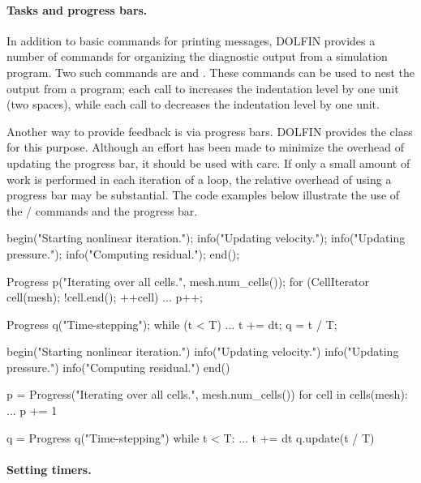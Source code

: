 \paragraph{Tasks and progress bars.}

In addition to basic commands for printing messages, DOLFIN provides a
number of commands for organizing the diagnostic output from a simulation
program. Two such commands are  and . These commands
can be used to nest the output from a program; each call to 
increases the indentation level by one unit (two spaces), while each
call to  decreases the indentation level by one unit.

Another way to provide feedback is via progress bars. DOLFIN provides
the  class for this purpose. Although an effort has been
made to minimize the overhead of updating the progress bar, it should
be used with care. If only a small amount of work is performed in each
iteration of a loop, the relative overhead of using a progress bar
may be substantial. The code examples below illustrate the use of the
/ commands and the progress bar.
\begin{c++}
begin("Starting nonlinear iteration.");
info("Updating velocity.");
info("Updating pressure.");
info("Computing residual.");
end();

Progress p("Iterating over all cells.", mesh.num_cells());
for (CellIterator cell(mesh); !cell.end(); ++cell)
{
  ...
  p++;
}

Progress q("Time-stepping");
while (t < T)
{
  ...
  t += dt;
  q = t / T;
}
\end{c++}
\begin{python}
begin("Starting nonlinear iteration.")
info("Updating velocity.")
info("Updating pressure.")
info("Computing residual.")
end()

p = Progress("Iterating over all cells.", mesh.num_cells())
for cell in cells(mesh):
  ...
  p += 1

q = Progress q("Time-stepping")
while t < T:
  ...
  t += dt
  q.update(t / T)
\end{python}

\paragraph{Setting timers.}


